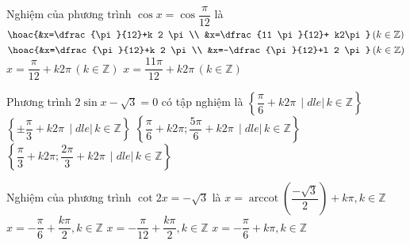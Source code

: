 \begin{ex}%
	 Nghiệm của phương trình $\cos x=\cos \dfrac{\pi}{12}$ là
	 \choice
		{$\hoac{&x=\dfrac{\pi}{12}+k 2 \pi \\  &x=\dfrac{11 \pi}{12}+ k2\pi}\,(k \in \mathbb{Z})$}
		{\True $\hoac{&x=\dfrac{\pi}{12}+k 2 \pi  \\ &x=-\dfrac{\pi}{12}+l 2 \pi}\,(k \in \mathbb{Z})$}
		 {$x=\dfrac{\pi}{12}+k2\pi \,(k \in \mathbb{Z})$}
		{$x=\dfrac{11 \pi}{12}+k2\pi \,(k  \in \mathbb{Z})$}
\end{ex}

\begin{ex}%
	Phương trình $2\sin x - \sqrt{3} = 0$ có tập  nghiệm là
	\choice 
		{$\left\{ \dfrac{\pi}{6} + k2\pi \,\mid  dle|\, k \in \mathbb{Z} \right\}$}
		{$\left\{ \pm \dfrac{\pi}{3} + k2\pi \,\mid dle|\, k \in \mathbb{Z}  \right\}$}
		{$\left\{ \dfrac{\pi}{6} + k2\pi; \dfrac{5\pi}{6}  + k2\pi \,\mid dle|\, k \in \mathbb{Z} \right\}$}
		{\True $\left\{ \dfrac{\pi}{3} + k2\pi; \dfrac{2\pi}{3} + k2\pi \,\mid dle|\, k  \in \mathbb{Z} \right\}$}
\end{ex}

\begin{ex}%
	Nghiệm của  phương trình $\cot 2x=-\sqrt{3}$ là
	\choice 
		{$x=\operatorname{arccot}\left(\dfrac{-\sqrt{3}}{2}\right)+k\pi, k\in\mathbb{Z}$} 
		 {$x=-\dfrac{\pi}{6}+\dfrac{k\pi}{2}, k\in\mathbb{Z}$}
		{\True $x=-\dfrac{\pi}{12}+\dfrac{k\pi}{2}, k\in\mathbb{Z}$} 
		 {$x=-\dfrac{\pi}{6}+k\pi, k\in\mathbb{Z}$}
\end{ex}

